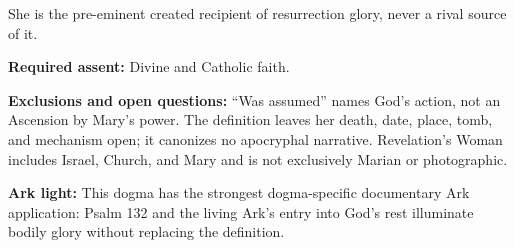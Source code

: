 \begin{studyframe}
She is the pre-eminent created recipient of resurrection glory, never a rival
source of it.\par
\textbf{Required assent:} Divine and Catholic faith.\par
\textbf{Exclusions and open questions:} ``Was assumed'' names God's action,
not an Ascension by Mary's power.  The definition leaves her death, date,
place, tomb, and mechanism open; it canonizes no apocryphal narrative.
Revelation's Woman includes Israel, Church, and Mary and is not exclusively
Marian or photographic.\par
\textbf{Ark light:} This dogma has the strongest dogma-specific documentary
Ark application: Psalm 132 and the living Ark's entry into God's rest illuminate
bodily glory without replacing the definition.
\end{studyframe}
\endgroup

\clearpage
